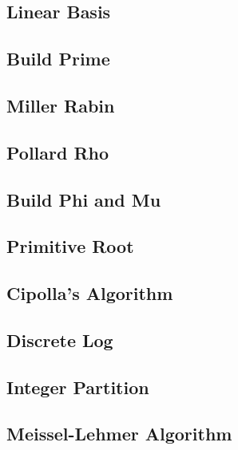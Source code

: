 \documentclass[a4paper,10pt,twocolumn,oneside]{article}
\begin{document}
\subsection{Linear Basis}


\subsection{Build Prime}


\subsection{Miller Rabin}


\subsection{Pollard Rho}


\subsection{Build Phi and Mu}


\subsection{Primitive Root}


\subsection{Cipolla's Algorithm}


\subsection{Discrete Log}


\subsection{Integer Partition}


\subsection{Meissel-Lehmer Algorithm}

\end{document}
